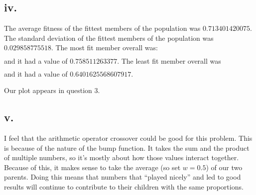 \documentclass[12pt]{article}
\begin{document}
\subsection{iv.}
The average fitness of the fittest members of the population was $0.713401420075$.  The standard deviation of the fittest members of the population was $0.029858775518$.  The most fit member overall was:
\begin{align*} 
[3.064198856410788, 3.045933757913558, 3.0890092039978754, 3.073307537865654,\\ 2.858687419720218, 3.1461361256283227, 2.9391049363260886, 2.9330114316619595,\\ 2.9671806260328584, 0.4104508863181406, 0.39050790783291395, 0.49497721875386846,\\ 0.30254155872490707, 0.5434266329774524, 0.45720003735193226, 0.5109670303882086, \\ 0.46143215389831327, 0.5951647847564943, 0.3188694696960166, 0.2766059603205482]
\end{align*}
and it had a value of $0.758511263377$.  The least fit member overall was
\begin{align*}
[0.23600114763555305, 3.073816196073199, 2.9982296511970827, 3.202720680187456, \\ 2.9790205461501564, 3.022382774230237, 2.9139448909249692, 2.962096586726405, \\ 0.39667140927739053, 2.9372073655011506, 3.107027601546546, 3.026677239579595, \\ 1.3551503841351584, 0.8043543265228381, 0.4950037102453887, 0.4471412754809059, \\ 0.13667890818517237, 0.24682261227206115, 0.1630153732730799, 0.09618401485986772]
\end{align*}
and it had a value of $0.6401625568607917$.

Our plot appears in question 3.

\subsection{v.}
I feel that the arithmetic operator crossover could be good for this problem.  This is because of the nature of the bump function.  It takes the sum and the product of multiple numbers, so it's mostly about how those values interact together.  Because of this, it makes sense to take the average (so set $w=0.5$) of our two parents.  Doing this means that numbers that ``played nicely'' and led to good results will continue to contribute to their children with the same proportions.
\end{document}
